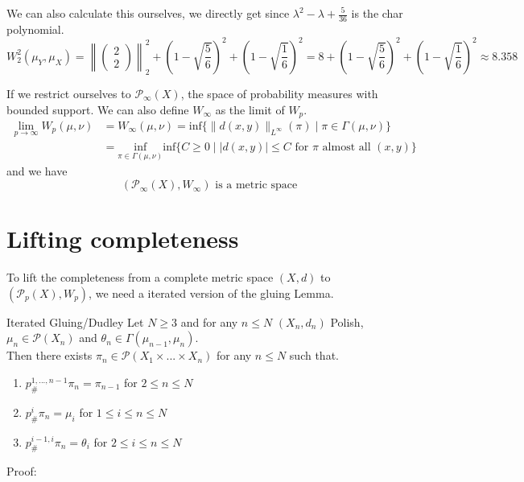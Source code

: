 \documentclass[15pt]{article}
\begin{document}
We can also calculate this ourselves, we directly get since $\lambda^2 - \lambda + \frac{5}{36}$ is the char polynomial. $$W_2^2(\mu_Y,\mu_X) = \left\|\begin{pmatrix}
  2 \\ 2
\end{pmatrix}\right\|_2^2 + \left(1-\sqrt{\frac{5}{6}}\right)^2 + \left(1-\sqrt{\frac{1}{6}}\right)^2 = 8 +\left(1-\sqrt{\frac{5}{6}}\right)^2 + \left(1-\sqrt{\frac{1}{6}}\right)^2 \approx 8.358$$
\bigbreak

If we restrict ourselves to $\mathcal{P}_\infty(X)$, the space of probability measures with bounded support. We can also define $W_\infty$ as the limit of $W_p$.
\begin{align*}\lim_{p \to \infty} W_p(\mu,\nu) &= W_\infty(\mu,\nu) =\text{inf}\{\|d(x,y)\|_{L^\infty}(\pi) \mid \pi \in \Gamma(\mu,\nu)\} \\
&= \underset{\pi \in \Gamma(\mu,\nu)}{\text{inf}}\text{inf}\{C \geq 0 \mid |d(x,y)| \leq C \text{ for } \pi \text{ almost all } (x,y)\} \end{align*} 
and we have $$(\mathcal{P}_\infty(X), W_\infty) \text{ is a metric space}$$

\section*{Lifting completeness}

To lift the completeness from a complete metric space $(X,d)$ to $(\mathcal{P}_p(X), W_p)$, we need a iterated version of the gluing Lemma.

\begin{lemma}{Iterated Gluing/Dudley}{}
  Let $N \geq 3$ and for any $n \leq N$ $(X_n,d_n)$ Polish, $\mu_n \in \mathcal{P}(X_n)$ and $\theta_n \in \Gamma(\mu_{n-1},\mu_n)$. \\ 
  Then there exists $\pi_n \in \mathcal{P}(X_1\times ... \times X_n)$ for any $n \leq N$ such that.
  \begin{enumerate}
      \item $p^{1,...,n-1}_{\#} \pi_n = \pi_{n-1}$ for $2 \leq n \leq N$
      \item $p^i_{\#} \pi_n = \mu_i$ for $1 \leq i \leq n \leq N$
      \item $p^{i-1,i}_{\#} \pi_n = \theta_i$ for $2 \leq i\leq n \leq N$
  \end{enumerate}
\end{lemma}

Proof: 
\vspace{0.3cm} \\
\end{document}
